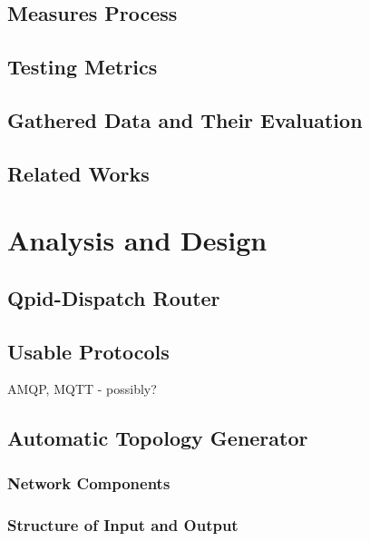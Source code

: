 \section{Measures Process}
\label{Measures Process}

\section{Testing Metrics}
\label{Testing Metrics}

\section{Gathered Data and Their Evaluation}
\label{Gathered Data and Their Evaluation}

\section{Related Works}
\label{Related Works}

\chapter{Analysis and Design}
\label{Analysis and Design}

\section{Qpid-Dispatch Router}

\section{Usable Protocols}
AMQP, MQTT - possibly?

\section{Automatic Topology Generator}

\subsection{Network Components}

\subsection{Structure of Input and Output}

